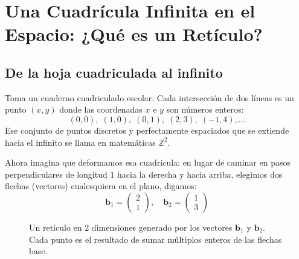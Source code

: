 \chapter{Una Cuadrícula Infinita en el Espacio: ¿Qué es un Retículo?}
\label{cap:reticulos_geometria}

\section{De la hoja cuadriculada al infinito}

Toma un cuaderno cuadriculado escolar. Cada intersección de dos líneas es un punto $(x, y)$ donde las coordenadas $x$ e $y$ son números enteros:
\[
(0,0),\; (1,0),\; (0,1),\; (2,3),\; (-1, 4),\dots
\]
Ese conjunto de puntos discretos y perfectamente espaciados que se extiende hacia el infinito se llama en matemáticas $\mathbb{Z}^2$.

Ahora imagina que deformamos esa cuadrícula: en lugar de caminar en pasos perpendiculares de longitud $1$ hacia la derecha y hacia arriba, elegimos dos flechas (vectores) cualesquiera en el plano, digamos:
\[
\mathbf{b}_1 = \begin{pmatrix} 2 \\ 1 \end{pmatrix}, \quad \mathbf{b}_2 = \begin{pmatrix} 1 \\ 3 \end{pmatrix}
\]

\begin{figure}[htbp]
\centering
{}
\caption{Un retículo en 2 dimensiones generado por los vectores $\mathbf{b}_1$ y $\mathbf{b}_2$. Cada punto es el resultado de sumar múltiplos enteros de las flechas base.}
\label{fig:reticulo_2d}
\end{figure}

